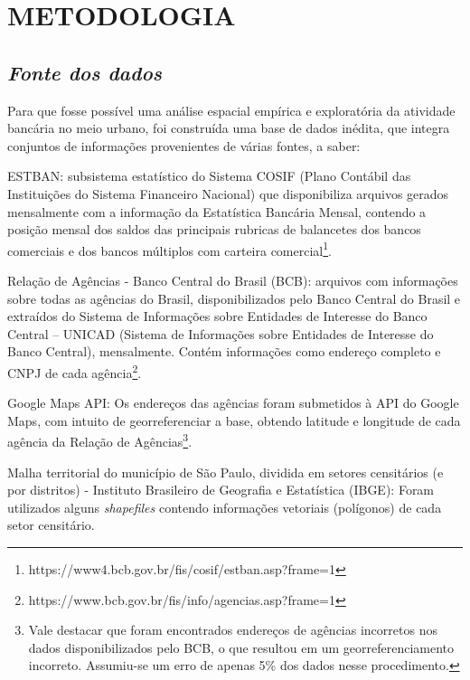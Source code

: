 \documentclass[a4paper,12pt]{article}
\begin{document}
\hypertarget{metodologia}{%
\section{METODOLOGIA}\label{metodologia}}

\hypertarget{fonte-dos-dados}{%
\subsection{\texorpdfstring{\emph{Fonte dos
dados}}{Fonte dos dados}}\label{fonte-dos-dados}}

Para que fosse possível uma análise espacial empírica e exploratória da
atividade bancária no meio urbano, foi construída uma base de dados
inédita, que integra conjuntos de informações provenientes de várias
fontes, a saber:

ESTBAN: subsistema estatístico do Sistema COSIF (Plano Contábil das
Instituições do Sistema Financeiro Nacional) que disponibiliza arquivos
gerados mensalmente com a informação da Estatística Bancária Mensal,
contendo a posição mensal dos saldos das principais rubricas de
balancetes dos bancos comerciais e dos bancos múltiplos com carteira
comercial\footnote{https://www4.bcb.gov.br/fis/cosif/estban.asp?frame=1}.

Relação de Agências - Banco Central do Brasil (BCB): arquivos com
informações sobre todas as agências do Brasil, disponibilizados pelo
Banco Central do Brasil e extraídos do Sistema de Informações sobre
Entidades de Interesse do Banco Central -- UNICAD (Sistema de
Informações sobre Entidades de Interesse do Banco Central), mensalmente.
Contém informações como endereço completo e CNPJ de cada
agência\footnote{https://www.bcb.gov.br/fis/info/agencias.asp?frame=1}.

Google Maps API: Os endereços das agências foram submetidos à API do
Google Maps, com intuito de georreferenciar a base, obtendo latitude e
longitude de cada agência da Relação de Agências\footnote{Vale destacar
  que foram encontrados endereços de agências incorretos nos dados
  disponibilizados pelo BCB, o que resultou em um georreferenciamento
  incorreto. Assumiu-se um erro de apenas 5\% dos dados nesse
  procedimento.}.

Malha territorial do município de São Paulo, dividida em setores
censitários (e por distritos) - Instituto Brasileiro de Geografia e
Estatística (IBGE): Foram utilizados alguns \emph{shapefiles} contendo
informações vetoriais (polígonos) de cada setor censitário.
\end{document}
